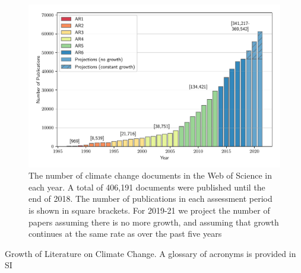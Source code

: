\documentclass{article}
\begin{document}
\begin{linenumbers}
		\begin{figure}[htp]
			\begin{center}
				\includegraphics[width=180mm]{../plots_pub/pubs_time_wgb.pdf}
				\caption{ The number of climate change documents in the Web of Science in each year. A total of 406,191 documents were published until the end of 2018. The number of publications in each assessment period is shown in square brackets. For 2019-21 we project the number of papers assuming there is no more growth, and assuming that growth continues at the same rate as over the past five years}
				\label{pub-growth}
			\end{center}
		\end{figure}
		
		
		\begin{table}[htp]
			\begin{center}
				{\scriptsize
					}
				\caption{Growth of Literature on Climate Change. A glossary of acronyms is provided in SI}
				\label{tab}
			\end{center}
		\end{table}
		

\end{linenumbers}
\end{document}
